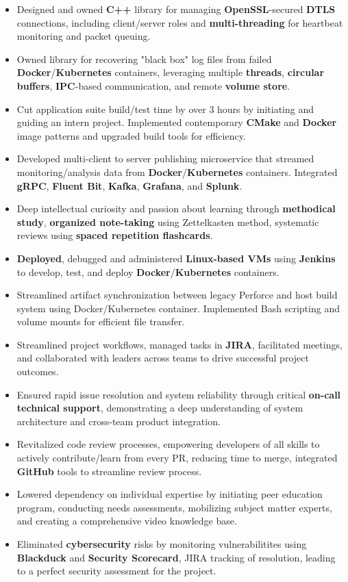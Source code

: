 \documentclass[a4paper]{article}
\begin{document}
\begin{itemize}
	\item Designed and owned \textbf{C++} library for managing \textbf{OpenSSL}-secured \textbf{DTLS} connections, including client/server roles and \textbf{multi-threading} for heartbeat monitoring and packet queuing.
	\item Owned library for recovering "black box" log files from failed \textbf{Docker}/\textbf{Kubernetes} containers, leveraging multiple \textbf{threads}, \textbf{circular buffers}, \textbf{IPC}-based communication, and remote \textbf{volume store}.
	\item Cut application suite build/test time by over 3 hours by initiating and guiding an intern project. Implemented contemporary \textbf{CMake} and \textbf{Docker} image patterns and upgraded build tools for efficiency.
	\item Developed multi-client to server publishing microservice that streamed monitoring/analysis data from \textbf{Docker}/\textbf{Kubernetes} containers. Integrated \textbf{gRPC}, \textbf{Fluent Bit}, \textbf{Kafka}, \textbf{Grafana}, and \textbf{Splunk}.
	\item Deep intellectual curiosity and passion about learning through \textbf{methodical study}, \textbf{organized note-taking} using Zettelkasten method, systematic reviews using \textbf{spaced repetition flashcards}.
	\item \textbf{Deployed}, debugged and administered \textbf{Linux-based VMs} using \textbf{Jenkins} to develop, test, and deploy \textbf{Docker}/\textbf{Kubernetes} containers.
	\item Streamlined artifact synchronization between legacy Perforce and host build system using Docker/Kubernetes container. Implemented Bash scripting and volume mounts for efficient file transfer.
	\item Streamlined project workflows, managed tasks in \textbf{JIRA}, facilitated meetings, and collaborated with leaders across teams to drive successful project outcomes.
	\item Ensured rapid issue resolution and system reliability through critical \textbf{on-call technical support}, demonstrating a deep understanding of system architecture and cross-team product integration.
	\item Revitalized code review processes, empowering developers of all skills to actively contribute/learn from every PR, reducing time to merge, integrated \textbf{GitHub} tools to streamline review process.
	\item Lowered dependency on individual expertise by initiating peer education program, conducting needs assessments, mobilizing subject matter experts, and creating a comprehensive video knowledge base.
	\item Eliminated \textbf{cybersecurity} risks by monitoring vulnerabilitites using \textbf{Blackduck} and \textbf{Security Scorecard}, JIRA tracking of resolution, leading to a perfect security assessment for the project.
\end{itemize}
\end{document}
